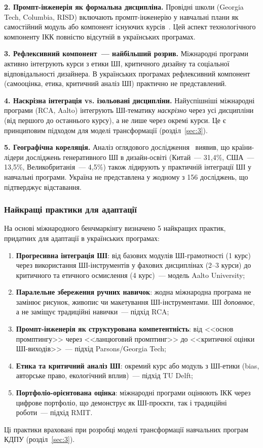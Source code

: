 \textbf{2. Промпт-інженерія як формальна дисципліна.} Провідні школи (Georgia Tech, Columbia, RISD) включають промпт-інженерію у навчальні плани як самостійний модуль або компонент існуючих курсів~\cite{Musiienko2026ScopingReview}. Цей аспект технологічного компоненту ІКК повністю відсутній в українських програмах.

\textbf{3. Рефлексивний компонент~--- найбільший розрив.} Міжнародні програми активно інтегрують курси з етики ШІ, критичного дизайну та соціальної відповідальності дизайнера. В українських програмах рефлексивний компонент (самооцінка, етика, критичний аналіз ШІ) практично не представлений.

\textbf{4. Наскрізна інтеграція vs. ізольовані дисципліни.} Найуспішніші міжнародні програми (RCA, Aalto) інтегрують ШІ-тематику \textit{наскрізно} через усі дисципліни (від першого до останнього курсу), а не лише через окремі курси. Це є принциповим підходом для моделі трансформації (розділ~\ref{sec:3}).

\textbf{5. Географічна кореляція.} Аналіз оглядового дослідження~\cite{Musiienko2026ScopingReview} виявив, що країни-лідери досліджень генеративного ШІ в дизайн-освіті (Китай~--- 31,4\%, США~--- 13,5\%, Великобританія~--- 4,5\%) також лідирують у практичній інтеграції ШІ у навчальні програми. Україна не представлена у жодному з 156 досліджень, що підтверджує відставання.

\subsubsection{Найкращі практики для адаптації}\label{sssec:2.3.4}

На основі міжнародного бенчмаркінгу визначено 5 найкращих практик, придатних для адаптації в українських програмах:

\begin{enumerate}
    \item \textbf{Прогресивна інтеграція ШІ}: від базових модулів ШІ-грамотності (1 курс) через використання ШІ-інструментів у фахових дисциплінах (2--3 курси) до критичного та етичного осмислення (4 курс)~--- модель Aalto University;
    \item \textbf{Паралельне збереження ручних навичок}: жодна міжнародна програма не замінює рисунок, живопис чи макетування ШІ-інструментами. ШІ \textit{доповнює}, а не заміщує традиційні навички~--- підхід RCA;
    \item \textbf{Промпт-інженерія як структурована компетентність}: від <<основ промптингу>> через <<ланцюговий промптинг>> до <<критичної оцінки ШІ-виходів>>~--- підхід Parsons/Georgia Tech;
    \item \textbf{Етика та критичний аналіз ШІ}: окремий курс або модуль з ШІ-етики (bias, авторське право, екологічний вплив)~--- підхід TU Delft;
    \item \textbf{Портфоліо-орієнтована оцінка}: міжнародні програми оцінюють ІКК через цифрове портфоліо, що демонструє як ШІ-проєкти, так і традиційні роботи~--- підхід RMIT.
\end{enumerate}

Ці практики враховані при розробці моделі трансформації навчальних програм КДПУ (розділ~\ref{sec:3}).
